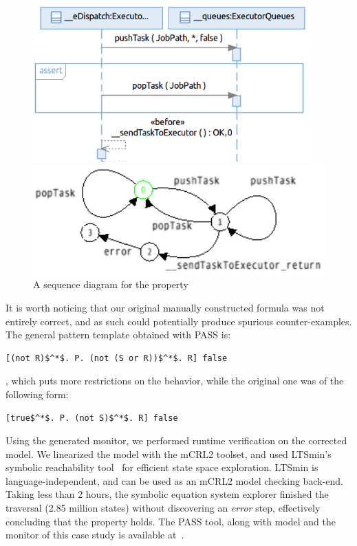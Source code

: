 \documentclass[letter]{llncs}
\begin{document}
\begin{figure}[!t]
 \centering
\begin{minipage}[!t]{0.5\linewidth}
\includegraphics[width=0.95\textwidth]{./SDProperty.png}%
\caption{A sequence diagram for the property}
\label{fig:SDProperty}
\end{minipage}%
\begin{minipage}[t]{0.5\linewidth}
\includegraphics[width=1.0\textwidth]{./PropertyAutomaton.png}%
%
\end{minipage}
\end{figure}
It is worth noticing that our original manually constructed formula was not entirely correct, and as such could potentially produce spurious counter-examples. 
The general pattern template obtained with PASS is:
\begin{lstlisting}[basicstyle=\sffamily\fontsize{7}{7}\selectfont,showspaces=false,showstringspaces=false,showtabs=false,mathescape]
[(not R)$^*$. P. (not (S or R))$^*$. R] false
\end{lstlisting} 
, which puts more restrictions on the behavior, while the original one was of the following form:
\begin{lstlisting}[basicstyle=\sffamily\fontsize{7}{7}\selectfont,showspaces=false,showstringspaces=false,showtabs=false,mathescape]
[true$^*$. P. (not S)$^*$. R] false
\end{lstlisting} 
Using the generated monitor, we performed runtime verification on the corrected model. We linearized the model with the mCRL2 toolset,
and used LTSmin's symbolic reachability tool~\cite{so62465} for efficient state space exploration. LTSmin is language-independent, and can be used as an mCRL2 model checking back-end. 
Taking less than 2 hours, the symbolic equation system explorer 
finished the traversal (2.85 million states) without discovering an \emph{error} step, effectively concluding that the property holds.
The PASS tool, along with model and the monitor of this case study is available at~\cite{repo:PASS}.
\vspace{-14 pt}
\end{document}
